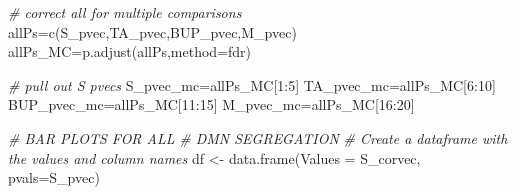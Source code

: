 \documentclass[
]{article}
\newenvironment{Shaded}{\begin{snugshade}}{\end{snugshade}}
\newcommand{\AttributeTok}[1]{\textcolor[rgb]{0.77,0.63,0.00}{#1}}
\newcommand{\CommentTok}[1]{\textcolor[rgb]{0.56,0.35,0.01}{\textit{#1}}}
\newcommand{\DecValTok}[1]{\textcolor[rgb]{0.00,0.00,0.81}{#1}}
\newcommand{\FunctionTok}[1]{\textcolor[rgb]{0.00,0.00,0.00}{#1}}
\newcommand{\NormalTok}[1]{#1}
\newcommand{\OtherTok}[1]{\textcolor[rgb]{0.56,0.35,0.01}{#1}}
\newcommand{\SpecialCharTok}[1]{\textcolor[rgb]{0.00,0.00,0.00}{#1}}
\newcommand{\StringTok}[1]{\textcolor[rgb]{0.31,0.60,0.02}{#1}}
\begin{document}
\begin{Shaded}
\begin{Highlighting}[]
\CommentTok{\# correct all for multiple comparisons}
\NormalTok{allPs}\OtherTok{=}\FunctionTok{c}\NormalTok{(S\_pvec,TA\_pvec,BUP\_pvec,M\_pvec)}
\NormalTok{allPs\_MC}\OtherTok{=}\FunctionTok{p.adjust}\NormalTok{(allPs,}\AttributeTok{method=}\StringTok{\textquotesingle{}fdr\textquotesingle{}}\NormalTok{)}

\CommentTok{\# pull out S pvecs}
\NormalTok{S\_pvec\_mc}\OtherTok{=}\NormalTok{allPs\_MC[}\DecValTok{1}\SpecialCharTok{:}\DecValTok{5}\NormalTok{]}
\NormalTok{TA\_pvec\_mc}\OtherTok{=}\NormalTok{allPs\_MC[}\DecValTok{6}\SpecialCharTok{:}\DecValTok{10}\NormalTok{]}
\NormalTok{BUP\_pvec\_mc}\OtherTok{=}\NormalTok{allPs\_MC[}\DecValTok{11}\SpecialCharTok{:}\DecValTok{15}\NormalTok{]}
\NormalTok{M\_pvec\_mc}\OtherTok{=}\NormalTok{allPs\_MC[}\DecValTok{16}\SpecialCharTok{:}\DecValTok{20}\NormalTok{]}

\CommentTok{\# BAR PLOTS FOR ALL}
\CommentTok{\# DMN SEGREGATION}
\CommentTok{\# Create a dataframe with the values and column names}
\NormalTok{df }\OtherTok{\textless{}{-}} \FunctionTok{data.frame}\NormalTok{(}\AttributeTok{Values =}\NormalTok{ S\_corvec, }\AttributeTok{pvals=}\NormalTok{S\_pvec)}


\end{Highlighting}
\end{Shaded}
\end{document}
